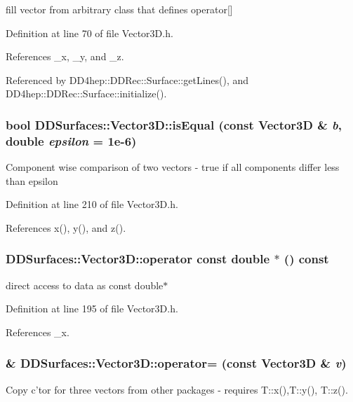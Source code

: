 fill vector from arbitrary class that defines operator\mbox{[}\mbox{]} 

Definition at line 70 of file Vector3D.h.

References \_\-x, \_\-y, and \_\-z.

Referenced by DD4hep::DDRec::Surface::getLines(), and DD4hep::DDRec::Surface::initialize().\hypertarget{class_d_d_surfaces_1_1_vector3_d_af6ffa436fc2d34bb4485b5a4a18d008e}{
\subsubsection[{isEqual}]{\setlength{\rightskip}{0pt plus 5cm}bool DDSurfaces::Vector3D::isEqual (const {\bf Vector3D} \& {\em b}, \/  double {\em epsilon} = {\ttfamily 1e-\/6})}}
\label{class_d_d_surfaces_1_1_vector3_d_af6ffa436fc2d34bb4485b5a4a18d008e}
Component wise comparison of two vectors -\/ true if all components differ less than epsilon 

Definition at line 210 of file Vector3D.h.

References x(), y(), and z().\hypertarget{class_d_d_surfaces_1_1_vector3_d_ad0e25d4efbcffb774004313492d79417}{
\subsubsection[{operator const double $\ast$}]{\setlength{\rightskip}{0pt plus 5cm}DDSurfaces::Vector3D::operator const double $\ast$ () const}}
\label{class_d_d_surfaces_1_1_vector3_d_ad0e25d4efbcffb774004313492d79417}


direct access to data as const double$\ast$ 

Definition at line 195 of file Vector3D.h.

References \_\-x.\hypertarget{class_d_d_surfaces_1_1_vector3_d_a5eeba7fd085f99ab01063a6abbb95db7}{
\subsubsection[{operator=}]{\& DDSurfaces::Vector3D::operator= (const {\bf Vector3D} \& {\em v})}}
\label{class_d_d_surfaces_1_1_vector3_d_a5eeba7fd085f99ab01063a6abbb95db7}
Copy c'tor for three vectors from other packages -\/ requires T::x(),T::y(), T::z(). 

